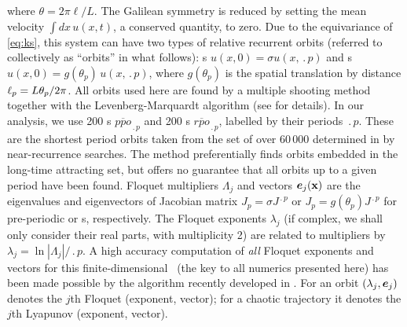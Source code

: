 \documentclass[prl,aps,preprint,showpacs,superscriptaddress]{revtex4-1} %
\begin{document}
where $\theta=2\pi\ell/L$.
The Galilean symmetry is reduced by setting the mean velocity
$\int\!dx\,u(x,t)$, a conserved quantity, to zero.
Due to the  equivariance of \eqref{eq:ks}, this system can have two
types of relative recurrent orbits
(referred to collectively as ``orbits'' in what follows):
\ppo s $u(x,0)={\sigma}u(x,\period{p})$
and
\rpo s $u(x,0)=g(\theta_{p})\,u(x,\period{p})$,
where
$g(\theta_{p})$ is the spatial
translation by distance $\ell_p=L\theta_{p}/2\pi$.
All orbits used here are found by a multiple shooting method
together with the
Levenberg-Marquardt algorithm (see  for details).
In our analysis, we use 200 \ppo s $\overline{ppo}_{\period{p}}$ and 200
\rpo s $\overline{rpo}_{\period{p}}$, labelled by their periods
$\period{p}$. These are the shortest period orbits taken from the set of
over 60\,000 determined in  by near-recurrence searches.
The method preferentially finds orbits embedded in the long-time
attracting set, but offers no guarantee that all orbits up to a given
period have been found.
Floquet multipliers $\Lambda_j$ and vectors $\bm{e}_j(\mathrm{\mathbf{x}})$ are the
eigenvalues and eigenvectors of Jacobian matrix
$J_p={\sigma}J^{\period{p}}$ or $J_p=g(\theta_{p})J^{\period{p}}$ for
pre-periodic or \rpo s, respectively.
The Floquet exponents $\lambda_j$
(if complex, we shall only consider their real parts, with multiplicity 2)
are related to multipliers by $\lambda_j=\ln|\Lambda_j|/\period{p}$.
A high accuracy computation of  {\em all} Floquet exponents and vectors
for this finite-dimensional \statesp\ (the key to all numerics presented
here) has been made possible by the algorithm recently developed in
.
For an orbit $(\lambda_j,\bm{e}_j)$ denotes the $j$th Floquet
(exponent, vector); for a chaotic trajectory it denotes the
$j$th Lyapunov (exponent, vector).
\end{document}
